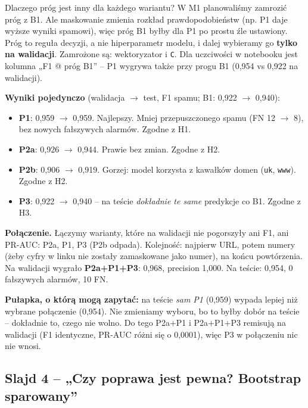 \documentclass[11pt,a4paper]{article}
\begin{document}
\begin{pojecie}{Dlaczego próg jest inny dla każdego wariantu?}
W M1 planowaliśmy zamrozić próg z B1. Ale maskowanie zmienia rozkład prawdopodobieństw (np. P1 daje wyższe wyniki
spamowi), więc próg B1 byłby dla P1 po prostu źle ustawiony. Próg to reguła decyzji, a nie hiperparametr modelu, i dalej
wybieramy go \textbf{tylko na walidacji}. Zamrożone są: wektoryzator i \texttt{C}. Dla uczciwości w notebooku jest kolumna
„F1 @ próg B1” -- P1 wygrywa także przy progu B1 (0,954 vs 0,922 na walidacji).
\end{pojecie}

\textbf{Wyniki pojedynczo} (walidacja $\to$ test, F1 spamu; B1: 0,922 $\to$ 0,940):
\begin{itemize}
  \item \textbf{P1}: 0,959 $\to$ 0,959. Najlepszy. Mniej przepuszczonego spamu (FN 12 $\to$ 8), bez nowych fałszywych alarmów.
        Zgodne z H1.
  \item \textbf{P2a}: 0,926 $\to$ 0,944. Prawie bez zmian. Zgodne z H2.
  \item \textbf{P2b}: 0,906 $\to$ 0,919. Gorzej: model korzysta z kawałków domen (\texttt{uk}, \texttt{www}). Zgodne z H2.
  \item \textbf{P3}: 0,922 $\to$ 0,940 -- na teście \emph{dokładnie te same} predykcje co B1. Zgodne z H3.
\end{itemize}

\textbf{Połączenie.} Łączymy warianty, które na walidacji nie pogorszyły ani F1, ani PR-AUC: P2a, P1, P3 (P2b odpada).
Kolejność: najpierw URL, potem numery (żeby cyfry w linku nie zostały zamaskowane jako numer), na końcu powtórzenia.
Na walidacji wygrało \textbf{P2a+P1+P3}: 0,968, precision 1,000. Na teście: 0,954, 0 fałszywych alarmów, 10 FN.

\begin{uwaga}
\textbf{Pułapka, o którą mogą zapytać:} na teście \emph{sam P1} (0,959) wypada lepiej niż wybrane połączenie (0,954).
Nie zmieniamy wyboru, bo to byłby dobór na teście -- dokładnie to, czego nie wolno. Do tego P2a+P1 i P2a+P1+P3 remisują
na walidacji (F1 identyczne, PR-AUC różni się o 0,0001), więc P3 w połączeniu nic nie wnosi.
\end{uwaga}

\subsection{Slajd 4 -- „Czy poprawa jest pewna? Bootstrap sparowany”}
\end{document}
